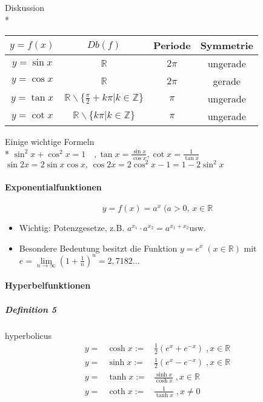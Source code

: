 \documentclass[a4paper]{scrartcl}
\begin{document}
Diskussion \\*
\begin{tabular}{c|c|c|c}
$y=f(x)$&$Db(f)$&Periode&Symmetrie\\ \hline
$y=\sin{x}$& $\mathbb{R}$ & $2 \pi$ & ungerade\\
$y=\cos{x}$ & $\mathbb{R}$ & $2\pi$ & gerade\\
$y=\tan{x}$ & $\mathbb{R} \backslash \{ \frac{\pi}{2} + k \pi \vert k \in \mathbb{Z} \}$ & $\pi$ & ungerade \\
$y=\cot{x}$ & $\mathbb{R} \backslash \{ k \pi \vert k \in \mathbb{Z} \}$ & $\pi$ & ungerade\\

\end{tabular}


Einige wichtige Formeln\\*
$\sin^2{x} + \cos^2{x}  = 1 \quad , \tan{x} = \frac{\sin{x}}{\cos{x}}, \cot{x}=\frac{1}{\tan{x}}$\\
$\sin{2x} = 2\sin{x}\cos{x}, \, \cos{2x} = 2 \cos^2{x}-1 = 1-2\sin^2{x}$

\paragraph{Exponentialfunktionen}
\[ y=f(x)=a^x \; (a > 0 , \, x \in \mathbb{R}\]

\begin{itemize}
\item Wichtig: Potenzgesetze, z.B. $ a^{x_1} \cdot a^{x_2} = a^{x_1 + x_2}$usw.
\item Besondere Bedeutung besitzt die Funktion $y=e^x \; (x\in \mathbb{R} )$ mit $e=\lim\limits_{n \rightarrow \infty} (1+\frac{1}{n})^n = 2,7182...$
\end{itemize}

\paragraph{Hyperbelfunktionen}
\subparagraph{Definition 5}hyperbolicus
\begin{align*}
y =& \cosh{x} :=& \frac{1}{2} (e^x + e^{-x})\; , x \in \mathbb{R}\\
y =& \sinh{x} :=& \frac{1}{2} (e^x - e^{-x})\; , x \in \mathbb{R}\\
y =& \tanh{x} :=& \frac{\sinh{x}}{\cosh{x}}\; , x \in \mathbb{R}\\
y =& \coth{x} :=& \frac{1}{\tanh{x}}\; , x \neq 0\\
\end{align*}
\end{document}

